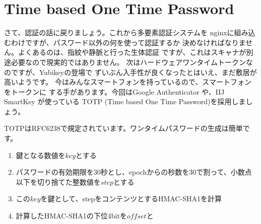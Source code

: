 \chapter*{Time based One Time Password}

さて、認証の話に戻りましょう。これから多要素認証システムを
nginxに組み込むわけですが、パスワード以外の何を使って認証するか
決めなければなりません。よくあるのは、指紋や静脈と行った生体認証
ですが、これはスキャナが別途必要なので現実的ではありません。
次はハードウェアワンタイムトークンなのですが、Yubikeyの登場で
ずいぶん入手性が良くなったとはいえ、まだ敷居が高いようです。
今はみんなスマートフォンを持っているので、スマートフォンをトークンに
する手があります。今回はGoogle Authenticator や、IIJ SmartKey が使っている
TOTP (Time based One Time Password)を採用しましょう。

TOTPはRFC6238で規定されています。ワンタイムパスワードの生成は簡単です。
\begin{enumerate}
\item 鍵となる数値を$key$とする
\item パスワードの有効期限を30秒とし、epochからの秒数を30で割って、小数点以下を切り捨てた整数値を$step$とする
\item この$key$を鍵として、stepをコンテンツとするHMAC-SHA1を計算
\item 計算したHMAC-SHA1の下位4bitを$offset$と
\end{enumerate}

